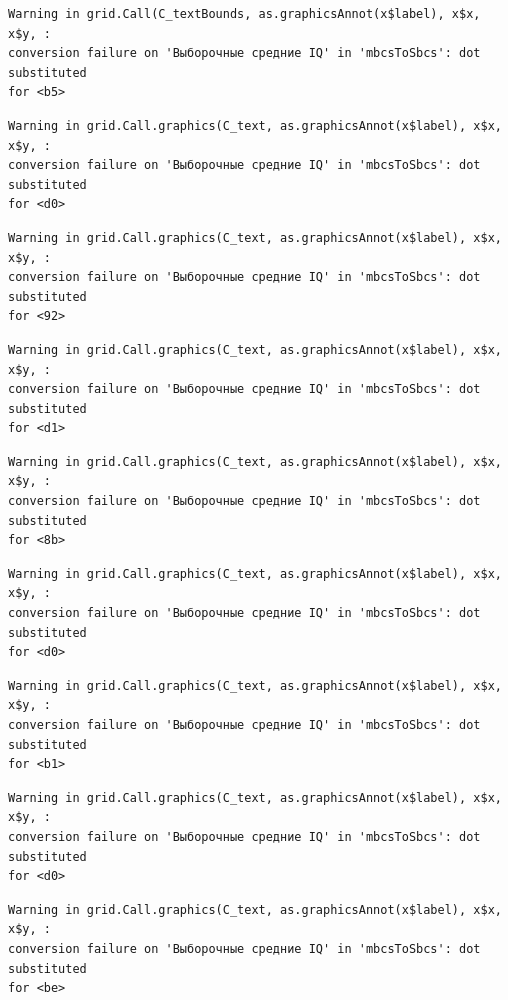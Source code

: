\documentclass[
  letterpaper,
  DIV=11,
  numbers=noendperiod]{scrreprt}
\theoremstyle{definition}
\theoremstyle{remark}
\begin{document}
\begin{verbatim}
Warning in grid.Call(C_textBounds, as.graphicsAnnot(x$label), x$x, x$y, :
conversion failure on 'Выборочные средние IQ' in 'mbcsToSbcs': dot substituted
for <b5>
\end{verbatim}

\begin{verbatim}
Warning in grid.Call.graphics(C_text, as.graphicsAnnot(x$label), x$x, x$y, :
conversion failure on 'Выборочные средние IQ' in 'mbcsToSbcs': dot substituted
for <d0>
\end{verbatim}

\begin{verbatim}
Warning in grid.Call.graphics(C_text, as.graphicsAnnot(x$label), x$x, x$y, :
conversion failure on 'Выборочные средние IQ' in 'mbcsToSbcs': dot substituted
for <92>
\end{verbatim}

\begin{verbatim}
Warning in grid.Call.graphics(C_text, as.graphicsAnnot(x$label), x$x, x$y, :
conversion failure on 'Выборочные средние IQ' in 'mbcsToSbcs': dot substituted
for <d1>
\end{verbatim}

\begin{verbatim}
Warning in grid.Call.graphics(C_text, as.graphicsAnnot(x$label), x$x, x$y, :
conversion failure on 'Выборочные средние IQ' in 'mbcsToSbcs': dot substituted
for <8b>
\end{verbatim}

\begin{verbatim}
Warning in grid.Call.graphics(C_text, as.graphicsAnnot(x$label), x$x, x$y, :
conversion failure on 'Выборочные средние IQ' in 'mbcsToSbcs': dot substituted
for <d0>
\end{verbatim}

\begin{verbatim}
Warning in grid.Call.graphics(C_text, as.graphicsAnnot(x$label), x$x, x$y, :
conversion failure on 'Выборочные средние IQ' in 'mbcsToSbcs': dot substituted
for <b1>
\end{verbatim}

\begin{verbatim}
Warning in grid.Call.graphics(C_text, as.graphicsAnnot(x$label), x$x, x$y, :
conversion failure on 'Выборочные средние IQ' in 'mbcsToSbcs': dot substituted
for <d0>
\end{verbatim}

\begin{verbatim}
Warning in grid.Call.graphics(C_text, as.graphicsAnnot(x$label), x$x, x$y, :
conversion failure on 'Выборочные средние IQ' in 'mbcsToSbcs': dot substituted
for <be>
\end{verbatim}
\end{document}
